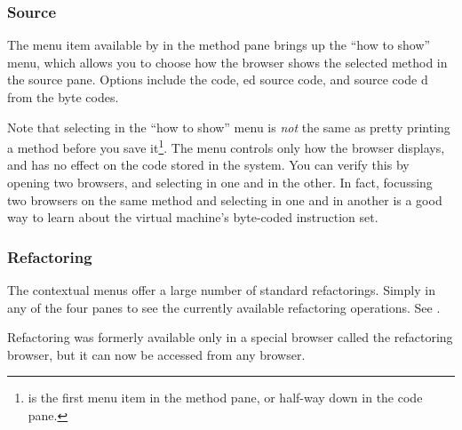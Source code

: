\documentclass[a4paper,10pt,twoside]{book}
\begin{document}

\subsubsection{Source}

The  menu item available by  in the method pane brings up the ``how to show'' menu, which allows you to choose how the browser shows the selected method in the source pane.  Options include the  code, ed source code,  and source code d from the byte codes.

Note that selecting  in the ``how to show'' menu is \emph{not} the same as pretty printing a method before you save it\footnote{ is the first menu item in the method pane, or half-way down in the code pane.}.  
The menu controls only how the browser displays, and has no effect on the code stored in the system.  
You can verify this  by opening two browsers, and selecting  in one and  in the other.   
In fact, focussing two browsers on the same method and selecting  in one and  in another is a good way to learn about the \pharo virtual machine's byte-coded instruction set.

\subsubsection{Refactoring}

The contextual menus offer a large number of standard refactorings.
Simply \actclick in any of the four panes to see the currently available refactoring operations.
See .

Refactoring was formerly available only in a special browser called the refactoring browser, but it can now be accessed from any browser.
\end{document}

